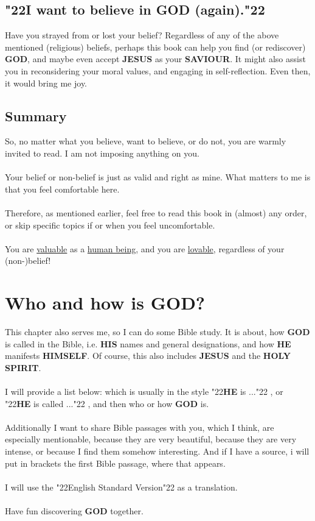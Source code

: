 \documentclass[12pt,a5paper]{article}
\newcommand{\God}[0]{\textbf{GOD}}
\newcommand{\He}[0]{\textbf{HE}}
\newcommand{\Himself}[0]{\textbf{HIMSELF}}
\newcommand{\His}[0]{\textbf{HIS}}
\newcommand{\Holy}[0]{\textbf{HOLY}}
\newcommand{\Jesus}[0]{\textbf{JESUS}}
\newcommand{\Saviour}[0]{\textbf{SAVIOUR}}
\newcommand{\Spirit}[0]{\textbf{SPIRIT}}
\newcommand{\q}[1]{\char"22{#1}\char"22 }
\begin{document}
	\subsection{\q{I want to believe in {\God} (again).}}
		Have you strayed from or lost your belief?
		Regardless of any of the above mentioned (religious) beliefs,
		perhaps this book can help you find (or rediscover) {\God},
		and maybe even accept {\Jesus} as your {\Saviour}.
		It might also assist you in reconsidering your moral values,
		and engaging in self-reflection.
		Even then,
		it would bring me joy.

	\subsection{Summary}
		So,
		no matter what you believe,
		want to believe,
		or do not,
		you are warmly invited to read.
		I am not imposing anything on you.
		\\
		\\
		Your belief or non-belief is just as valid and right as mine.
		What matters to me is that you feel comfortable here.
		\\
		\\
		Therefore,
		as mentioned earlier,
		feel free to read this book in (almost) any order,
		or skip specific topics if or when you feel uncomfortable.
		\\
		\\
		You are \underline{valuable} as a \underline{human being},
		and you are \underline{lovable},
		regardless of your (non-)belief!
		
	\newpage
	\section{Who and how is {\God}?}
		This chapter also serves me,
		so I can do some Bible study.
		It is about,
		how {\God} is called in the Bible,
		i.e. {\His} names and general designations,
		and how {\He} manifests {\Himself}.
		Of course,
		this also includes {\Jesus} and the {\Holy} {\Spirit}.
		\\
		\\
		I will provide a list below:
		which is usually in the style \q{{\He} is ...},
		or \q{{\He} is called ...},
		and then who or how {\God} is.
		\\
		\\
		Additionally I want to share Bible passages with you,
		which I think,
		are especially mentionable,
		because they are very beautiful,
		because they are very intense,
		or because I find them somehow interesting.
		And if I have a source,
		i will put in brackets the first Bible passage,
		where that appears.
		\\
		\\
		I will use the \q{English Standard Version} as a translation.
		\\
		\\
		Have fun discovering {\God} together.
\end{document}
